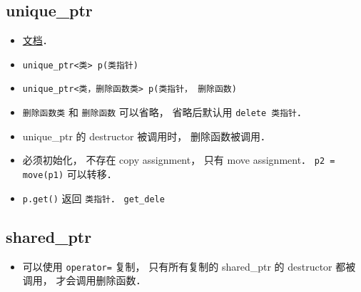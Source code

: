 
\begin{issues}
\issueDraft
\end{issues}

\subsection{unique_ptr}
\begin{itemize}
\item \href{https://en.cppreference.com/w/cpp/memory/unique_ptr}{文档}．
\item \verb|unique_ptr<类> p(类指针)|
\item \verb|unique_ptr<类，删除函数类> p(类指针， 删除函数)|
\item \verb|删除函数类| 和 \verb|删除函数| 可以省略， 省略后默认用 \verb|delete 类指针|．
\item unique_ptr 的 destructor 被调用时， 删除函数被调用．
\item 必须初始化， 不存在 copy assignment， 只有 move assignment． \verb|p2 = move(p1)| 可以转移．
\item \verb|p.get()| 返回 \verb|类指针|． \verb|get_dele|
\end{itemize}

\subsection{shared_ptr}
\begin{itemize}
\item 可以使用 \verb|operator=| 复制， 只有所有复制的 shared_ptr 的 destructor 都被调用， 才会调用删除函数．
\end{itemize}
